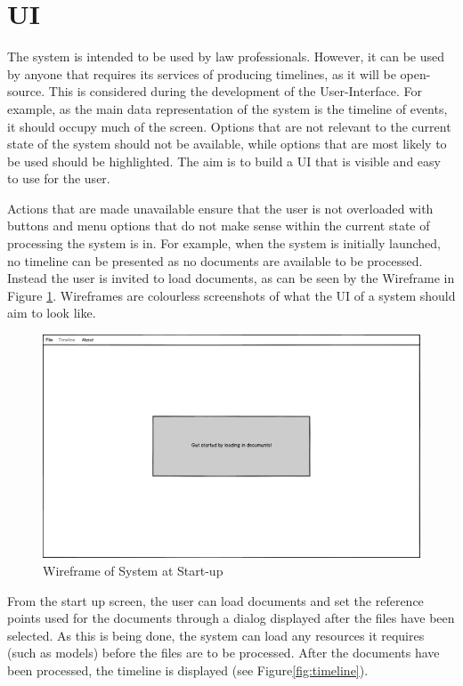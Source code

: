 \section{UI}
\par The system is intended to be used by law professionals. However, it can be used by anyone that requires its services of producing timelines, as it will be open-source. This is considered during the development of the User-Interface. For example, as the main data representation of the system is the timeline of events, it should occupy much of the screen. Options that are not relevant to the current state of the system should not be available, while options that are most likely to be used should be highlighted. The aim is to build a UI that is visible and easy to use for the user.
\par Actions that are made unavailable ensure that the user is not overloaded with buttons and menu options that do not make sense within the current state of processing the system is in. For example, when the system is initially launched, no timeline can be presented as no documents are available to be processed. Instead the user is invited to load documents, as can be seen by the Wireframe in Figure \ref{fig:startup}. Wireframes are colourless screenshots of what the UI of a system should aim to look like.
\begin{figure}[H]
\caption{Wireframe of System at Start-up}
\label{fig:startup}
\includegraphics[width=\linewidth]{startup.png}
\centering
\end{figure}
\par From the start up screen, the user can load documents and set the reference points used for the documents through a dialog displayed after the files have been selected. As this is being done, the system can load any resources it requires (such as models) before the files are to be processed. After the documents have been processed, the timeline is displayed (see Figure\ref{fig:timeline}).
